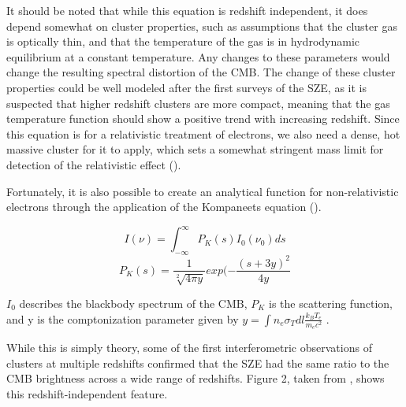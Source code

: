 \documentclass[manuscript]{aastex}
\begin{document}
It should be noted that while this equation is redshift independent, it does depend somewhat on cluster properties, such as assumptions that the cluster gas is optically thin, and that the temperature of the gas is in hydrodynamic equilibrium at a constant temperature. Any changes to these parameters would change the resulting spectral distortion of the CMB. The change of these cluster properties could be well modeled after the first surveys of the SZE, as it is suspected that higher redshift clusters are more compact, meaning that the gas temperature function should show a positive trend with increasing redshift. Since this equation is for a relativistic treatment of electrons, we also need a dense, hot massive cluster for it to apply, which sets a somewhat stringent mass limit for detection of the relativistic effect (\cite{Carlstrom2002}).

Fortunately, it is also possible to create an analytical function for non-relativistic electrons through the application of the Kompaneets equation (\cite{Birkinshaw1999}).

\begin{equation}
I(\nu) = \int_{-\infty}^{\infty} P_{K}(s) I_{0}(\nu_{0}) ds
\end{equation}
\begin{equation}
P_{K}(s) = \frac{1}{\sqrt[2]{4 \pi y}} exp(-\frac{(s + 3y)^{2}}{4y}
\end{equation}

\(I_{0}\) describes the blackbody spectrum of the CMB, \(P_{K}\) is the scattering function, and y is the comptonization parameter given by \(y = \int   n_{e}   \sigma_{T}   dl   \frac{k_{B}T_{e}}{m_{e}c^{2}}\) .

While this is simply theory, some of the first interferometric observations of clusters at multiple redshifts confirmed that the SZE had the same ratio to the CMB brightness across a wide range of redshifts. Figure 2, taken from \cite{Carlstrom2002}, shows this redshift-independent feature.
\end{document}
